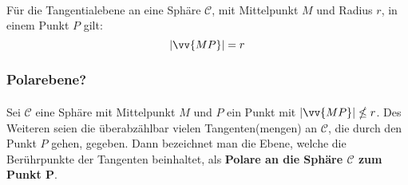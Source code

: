 \documentclass[main.tex]{subfiles}
\begin{document}
            \begin{Theorem}[- Tangentialebene]
                \paragraph{} Für die Tangentialebene an eine Sphäre $\mathscr{C}$, mit Mittelpunkt $M$ und Radius $r$, in einem Punkt $P$ gilt:
                                                    $$|\vv{MP}| = r$$
            \end{Theorem}

        \subsubsection{Polarebene?}

            \begin{Definition}
                \paragraph{} Sei $\mathscr{C}$ eine Sphäre mit Mittelpunkt $M$ und $P$ ein Punkt mit $|\vv{MP}| \nleq r$. Des Weiteren seien die überabzählbar vielen Tangenten(mengen) an $\mathscr{C}$, die durch den Punkt $P$ gehen, gegeben. Dann bezeichnet man die Ebene, welche die Berührpunkte der Tangenten beinhaltet, als \textbf{Polare an die Sphäre $\mathscr{C}$ zum Punkt P}.
            \end{Definition}
\end{document}
